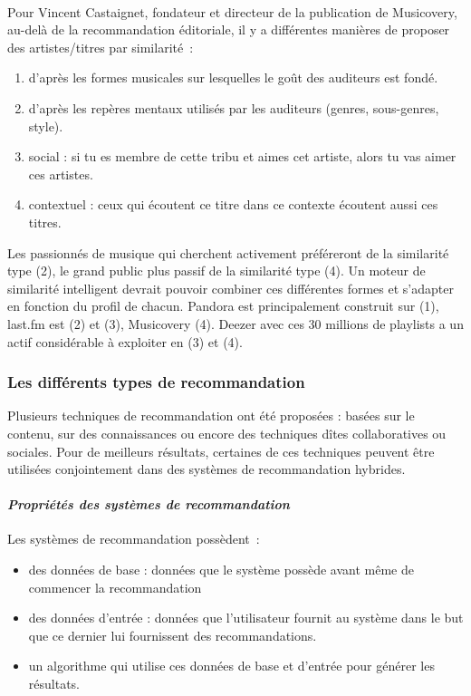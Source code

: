 \paragraph{}
Pour Vincent Castaignet\cite{Cast11}, fondateur et directeur de la publication de Musicovery, au-delà de la recommandation éditoriale, il y a différentes manières de proposer des artistes/titres par similarité~:
\begin{enumerate}
	\item d’après les formes musicales sur lesquelles le goût des auditeurs est fondé.
	\item d’après les repères mentaux utilisés par les auditeurs (genres, sous-genres, style).
	\item social  : si tu es membre de cette tribu et aimes cet artiste, alors tu vas aimer ces artistes.
	\item contextuel  : ceux qui écoutent ce titre dans ce contexte écoutent aussi ces titres.
\end{enumerate}
Les passionnés de musique qui cherchent activement préféreront de la similarité type (2), le grand public plus passif de la similarité type (4). Un moteur de similarité intelligent devrait pouvoir combiner ces différentes formes et s’adapter en fonction du profil de chacun.
Pandora est principalement construit sur (1), last.fm est (2) et (3), Musicovery (4). Deezer avec ces 30 millions de playlists a un actif considérable à exploiter en (3) et (4).

 		\subsubsection*{Les différents types de recommandation}
Plusieurs techniques de recommandation ont été proposées\cite{Burk02} : basées sur le contenu, sur des connaissances ou encore des techniques dîtes collaboratives ou sociales. Pour de meilleurs résultats, certaines de ces techniques peuvent être utilisées conjointement dans des systèmes de recommandation hybrides.

	\paragraph{\emph{Propriétés des systèmes de recommandation} \\ \quad}
Les systèmes de recommandation possèdent\cite{Burk02}~:
\begin{itemize}
	\item des données de base : données que le système possède avant même de commencer la recommandation
	\item des données d’entrée : données que l’utilisateur fournit au système dans le but que ce dernier lui fournissent des recommandations.
	\item un algorithme qui utilise ces données de base et d’entrée pour générer les résultats.
\end{itemize}

